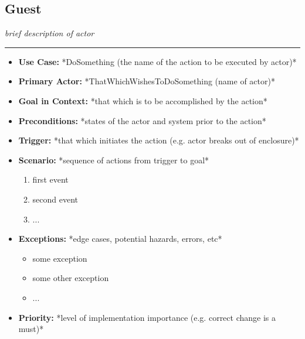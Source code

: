 \documentclass[12pt]{article}
\begin{document}
    \subsection{Guest}
    \textit{brief description of actor}
    \par\noindent\rule{\textwidth}{0.4pt}    
    \begin{itemize} %
        \item[]\textbf{Use Case:}                                
            *DoSomething (the name of the action to be executed by actor)*

        \item[]\textbf{Primary Actor:}
            *ThatWhichWishesToDoSomething (name of actor)*

        \item[]\textbf{Goal in Context:}
            *that which is to be accomplished by the action*

        \item[]\textbf{Preconditions:}
            *states of the actor and system prior to the action*

        \item[]\textbf{Trigger:}
            *that which initiates the action (e.g. actor breaks out of enclosure)*

        \item[]\textbf{Scenario:}
            *sequence of actions from trigger to goal*
            \begin{enumerate}
                \item first event
                \item second event
                \item ...
            \end{enumerate}

        \item[]\textbf{Exceptions:}
            *edge cases, potential hazards, errors, etc*
            \begin{itemize}
                \item[] some exception
                \item[] some other exception                
                \item[] ...
            \end{itemize}

        \item[]\textbf{Priority:}
            *level of implementation importance (e.g. correct change is a must)*


\end{itemize}
\end{document}
